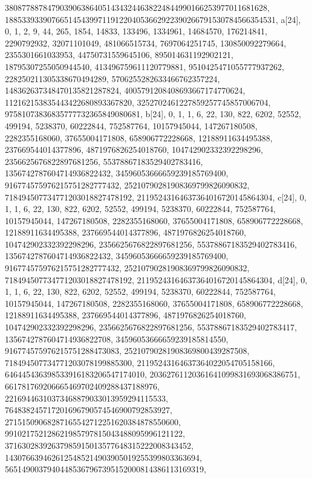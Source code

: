 {{{   38087788784790390638640514343244638224844990166253977011681628, 
   1885339339076651454399711912204053662922390266791530784566354531}}, 
 {a[24], {0, 1, 2, 9, 44, 265, 1854, 14833, 133496, 1334961, 14684570, 
   176214841, 2290792932, 32071101049, 481066515734, 7697064251745, 
   130850092279664, 2355301661033953, 44750731559645106, 895014631192902121, 
   18795307255050944540, 413496759611120779881, 9510425471055777937262, 
   228250211305338670494289, 5706255282633466762357224, 
   148362637348470135821287824, 4005791208408693667174770624, 
   112162153835443422680893367820, 3252702461227859257745857006704, 
   97581073836835777732365849080681}}, 
 {b[24], {0, 1, 1, 6, 22, 130, 822, 6202, 52552, 499194, 5238370, 60222844, 
   752587764, 10157945044, 147267180508, 2282355168060, 37655004171808, 
   658906772228668, 12188911634495388, 237669544014377896, 
   4871976826254018760, 104742902332392298296, 2356625676822897681256, 
   55378867183529402783416, 1356742787604714936822432, 
   34596053666659239185769400, 916774575976215751282777432, 
   25210790281908369799826090832, 718494507734771203018827478192, 
   21195243164637364016720145864304}}, 
 {c[24], {0, 1, 1, 6, 22, 130, 822, 6202, 52552, 499194, 5238370, 60222844, 
   752587764, 10157945044, 147267180508, 2282355168060, 37655004171808, 
   658906772228668, 12188911634495388, 237669544014377896, 
   4871976826254018760, 104742902332392298296, 2356625676822897681256, 
   55378867183529402783416, 1356742787604714936822432, 
   34596053666659239185769400, 916774575976215751282777432, 
   25210790281908369799826090832, 718494507734771203018827478192, 
   21195243164637364016720145864304}}, 
 {d[24], {0, 1, 1, 6, 22, 130, 822, 6202, 52552, 499194, 5238370, 60222844, 
   752587764, 10157945044, 147267180508, 2282355168060, 37655004171808, 
   658906772228668, 12188911634495388, 237669544014377896, 
   4871976826254018760, 104742902332392298296, 2356625676822897681256, 
   55378867183529402783417, 1356742787604714936822708, 
   34596053666659239185814550, 916774575976215751288473083, 
   25210790281908369800439287508, 718494507734771203078199885300, 
   21195243164637364022054705158166, 646445436398533916183206547174010, 
   20362761120361641099831693068386751, 661781769206665469702409288437188976, 
   22169446310373468879033013959294115533, 
   764838245717201696790574546900792853927, 
   27151509068287165542712251620384878550600, 
   991021752128621985797815043488095996121122, 
   37163028392637985915013577648315222008343452, 
   1430766394626125485214903905019255399803363694, 
   56514900379404485367967395152000814386113169319, 
}}}
